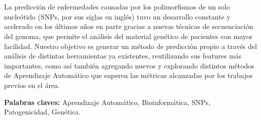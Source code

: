 \chapter*{\runtitulo}

\noindent La predicción de enfermedades causadas por los polimorfismos de un solo nucleótido (SNPs, por sus siglas en inglés) tuvo un desarrollo constante y acelerado en los últimos años en parte gracias a nuevas técnicas de secuenciación del genoma, que permite el análisis del material genético de pacientes con mayor facilidad. Nuestro objetivo es generar un método de predicción propio a través del análisis de distintas herramientas ya existentes, reutilizando sus features más importantes, como así también agregando nuevos y explorando distintos métodos de Aprendizaje Automático que superen las métricas alcanzadas por los trabajos previos en el área.

\bigskip

\noindent\textbf{Palabras claves:} Aprendizaje Automático, Bioinformática, SNPs, Patogenicidad, Genética.